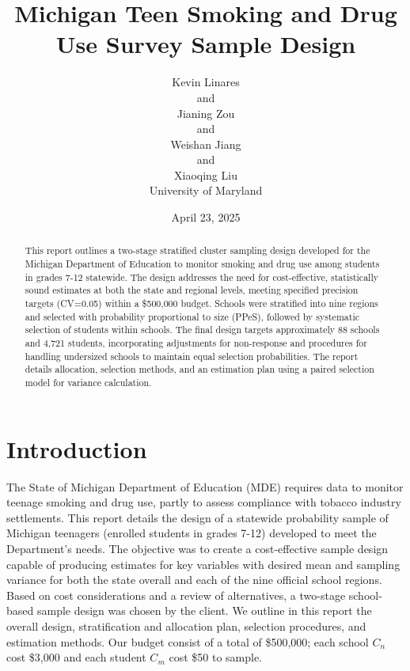 \documentclass[
  12pt]{article}
\begin{document}
\def\spacingset#1{\renewcommand{\baselinestretch}%
{#1}\small\normalsize} \spacingset{1}



\date{April 23, 2025}
\title{\bf Michigan Teen Smoking and Drug Use Survey Sample Design}
\author{
Kevin Linares\\
and\\Jianing Zou\\
and\\Weishan Jiang\\
and\\Xiaoqing Liu\\
University of Maryland\\
}
\maketitle

\bigskip
\bigskip
\begin{abstract}
This report outlines a two-stage stratified cluster sampling design
developed for the Michigan Department of Education to monitor smoking
and drug use among students in grades 7-12 statewide. The design
addresses the need for cost-effective, statistically sound estimates at
both the state and regional levels, meeting specified precision targets
(CV=0.05) within a \$500,000 budget. Schools were stratified into nine
regions and selected with probability proportional to size (PPeS),
followed by systematic selection of students within schools. The final
design targets approximately 88 schools and 4,721 students,
incorporating adjustments for non-response and procedures for handling
undersized schools to maintain equal selection probabilities. The report
details allocation, selection methods, and an estimation plan using a
paired selection model for variance calculation.
\end{abstract}


\newpage
\spacingset{1.9} %


\section{Introduction}\label{sec-intro}

The State of Michigan Department of Education (MDE) requires data to
monitor teenage smoking and drug use, partly to assess compliance with
tobacco industry settlements. This report details the design of a
statewide probability sample of Michigan teenagers (enrolled students in
grades 7-12) developed to meet the Department's needs. The objective was
to create a cost-effective sample design capable of producing estimates
for key variables with desired mean and sampling variance for both the
state overall and each of the nine official school regions. Based on
cost considerations and a review of alternatives, a two-stage
school-based sample design was chosen by the client. We outline in this
report the overall design, stratification and allocation plan, selection
procedures, and estimation methods. Our budget consist of a total of
\$500,000; each school \(C_n\) cost \$3,000 and each student \(C_m\)
cost \$50 to sample.\\
\end{document}
